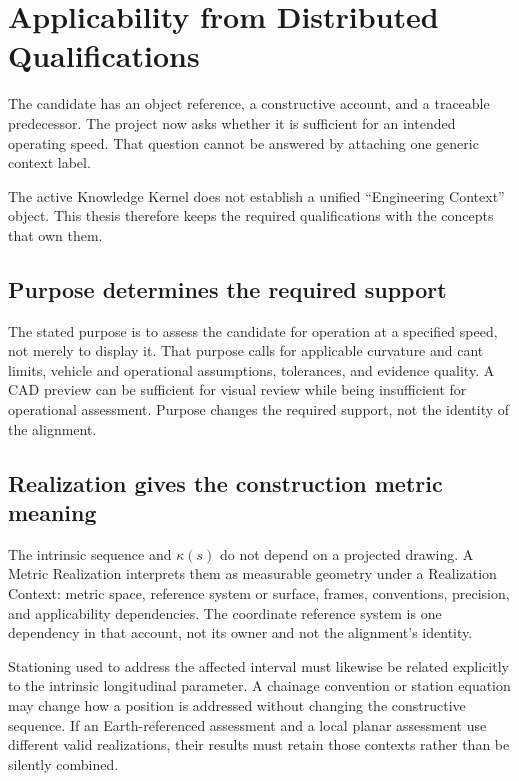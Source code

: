 
\chapter{Applicability from Distributed Qualifications}
\label{chap:engineering-context}

The candidate has an object reference, a constructive account, and a
traceable predecessor. The project now asks whether it is sufficient for an
intended operating speed. That question cannot be answered by attaching one
generic context label.

The active Knowledge Kernel does not establish a unified ``Engineering
Context'' object. This thesis therefore keeps the required qualifications with
the concepts that own them.

\section{Purpose determines the required support}

The stated purpose is to assess the candidate for operation at a specified
speed, not merely to display it. That purpose calls for applicable curvature
and cant limits, vehicle and operational assumptions, tolerances, and evidence
quality. A CAD preview can be sufficient for visual review while being
insufficient for operational assessment. Purpose changes the required support,
not the identity of the alignment.

\section{Realization gives the construction metric meaning}

The intrinsic sequence and $\kappa(s)$ do not depend on a projected drawing.
A Metric Realization interprets them as measurable geometry under a
Realization Context: metric space, reference system or surface, frames,
conventions, precision, and applicability dependencies. The coordinate
reference system is one dependency in that account, not its owner and not the
alignment's identity.

Stationing used to address the affected interval must likewise be related
explicitly to the intrinsic longitudinal parameter. A chainage convention or
station equation may change how a position is addressed without changing the
constructive sequence. If an Earth-referenced assessment and a local planar
assessment use different valid realizations, their results must retain those
contexts rather than be silently combined.

